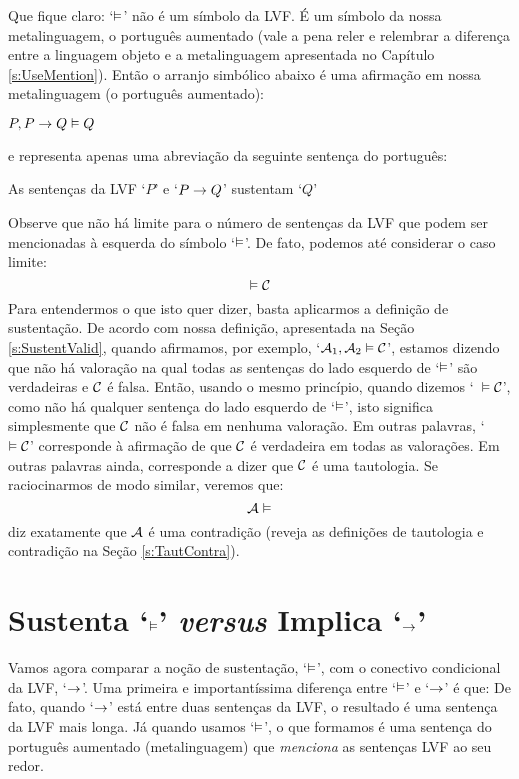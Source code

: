 Que fique claro: `$\vDash$' não é um símbolo da LVF.
É um símbolo da nossa metalinguagem, o português aumentado (vale a pena reler e relembrar a diferença entre a linguagem objeto e a metalinguagem apresentada no Capítulo  \ref{s:UseMention}).
Então o arranjo simbólico abaixo é uma afirmação em nossa metalinguagem (o português aumentado):
	\begin{ebullet}
		\item $P, P \rightarrow Q \vDash Q$
	\end{ebullet}
e representa apenas uma abreviação da seguinte sentença do português:
	\begin{ebullet}
		\item As sentenças da LVF `$P$' e `$P \rightarrow Q$' sustentam `$Q$'
	\end{ebullet}
Observe que não há limite para o número de sentenças da LVF que podem ser mencionadas à esquerda do símbolo `$\vDash$'.
De fato, podemos até considerar o caso limite:
	$$\vDash \mathcal{C}$$
Para entendermos o que isto quer dizer, basta aplicarmos a definição de sustentação.
De acordo com nossa definição, apresentada na Seção \ref{s:SustentValid}, quando afirmamos, por exemplo, `$\mathcal{A}_1, \mathcal{A}_2 \vDash \mathcal{C}$', estamos dizendo que não há valoração na qual todas as sentenças do lado esquerdo de `$\vDash$' são verdadeiras e $\mathcal{C}$ é falsa.
Então, usando o mesmo princípio, quando dizemos `\ $\vDash \mathcal{C}$', como não há qualquer sentença do lado esquerdo de `$\vDash$', isto significa simplesmente que $\mathcal{C}$ não é falsa em nenhuma valoração.
Em outras palavras, `\ $\vDash \mathcal{C}$' corresponde à afirmação de que $\mathcal{C}$ é verdadeira em todas as valorações.
Em outras palavras ainda, corresponde a dizer que $\mathcal{C}$ é uma tautologia.
Se raciocinarmos de modo similar, veremos que:
	$$\mathcal{A} \vDash$$
diz exatamente que $\mathcal{A}$ é uma contradição (reveja as definições de tautologia e contradição na Seção \ref{s:TautContra}).


\section[Sustenta \emph{versus} implica]{Sustenta `$\vDash$' \emph{versus} Implica `$\rightarrow$'}\label{s:SustVsCond}
Vamos agora comparar a noção de sustentação, `$\vDash$', com o conectivo condicional da LVF, `$\rightarrow$'.
Uma primeira e importantíssima diferença entre `$\vDash$' e `$\rightarrow$' é que:
{\small
	}
De fato, quando `$\rightarrow$' está entre duas sentenças da LVF, o resultado é uma sentença da LVF mais longa.
Já quando usamos `$\vDash$', o que formamos é uma sentença do português aumentado (metalinguagem) que \emph{menciona} as sentenças LVF ao seu redor.

